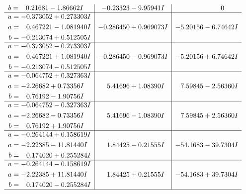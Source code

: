 \documentclass[1p]{elsarticle_modified}
\theoremstyle{definition}
\begin{document}
$$\begin{array}{c|c|c}
\begin{aligned}
b &= \phantom{-}0.21681 - 1.86662 I\end{aligned}
 & -0.23323 - 9.95941 I & \phantom{-0.000000 } 0 \\ \hline\begin{aligned}
u &= -0.373052 + 0.273303 I \\
a &= \phantom{-}0.467221 - 1.081940 I \\
b &= -0.213074 + 0.512505 I\end{aligned}
 & -0.286450 + 0.969073 I & -5.20156 - 6.74642 I \\ \hline\begin{aligned}
u &= -0.373052 - 0.273303 I \\
a &= \phantom{-}0.467221 + 1.081940 I \\
b &= -0.213074 - 0.512505 I\end{aligned}
 & -0.286450 - 0.969073 I & -5.20156 + 6.74642 I \\ \hline\begin{aligned}
u &= -0.064752 + 0.327363 I \\
a &= -2.26682 + 0.73356 I \\
b &= \phantom{-}0.76192 - 1.90756 I\end{aligned}
 & \phantom{-}5.41696 + 1.08390 I & \phantom{-}7.59845 - 2.56360 I \\ \hline\begin{aligned}
u &= -0.064752 - 0.327363 I \\
a &= -2.26682 - 0.73356 I \\
b &= \phantom{-}0.76192 + 1.90756 I\end{aligned}
 & \phantom{-}5.41696 - 1.08390 I & \phantom{-}7.59845 + 2.56360 I \\ \hline\begin{aligned}
u &= -0.264144 + 0.158619 I \\
a &= -2.22385 - 11.81440 I \\
b &= \phantom{-}0.174020 + 0.255284 I\end{aligned}
 & \phantom{-}1.84425 - 0.21555 I & -54.1683 - 39.7304 I \\ \hline\begin{aligned}
u &= -0.264144 - 0.158619 I \\
a &= -2.22385 + 11.81440 I \\
b &= \phantom{-}0.174020 - 0.255284 I\end{aligned}
 & \phantom{-}1.84425 + 0.21555 I & -54.1683 + 39.7304 I\\
 \hline 
 \end{array}$$\newpage$$\begin{array}{c|c|c}  

\end{array}$$
\end{document}
